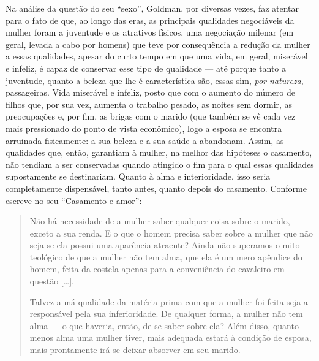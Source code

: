 Na análise da questão do seu ``sexo'', Goldman, por diversas vezes, faz
atentar para o fato de que, ao longo das eras, as principais qualidades
negociáveis da mulher foram a juventude e os atrativos físicos, uma
negociação milenar (em geral, levada a cabo por homens) que teve por
consequência a redução da mulher a essas qualidades, apesar do curto
tempo em que uma vida, em geral, miserável e infeliz, é capaz de
conservar esse tipo de qualidade --- até porque tanto a juventude, quanto
a beleza que lhe é característica são, essas sim, \emph{por natureza},
passageiras. Vida miserável e infeliz, posto que com o aumento do número
de filhos que, por sua vez, aumenta o trabalho pesado, as noites sem
dormir, as preocupações e, por fim, as brigas com o marido (que também
se vê cada vez mais pressionado do ponto de vista econômico), logo a
esposa se encontra arruinada fisicamente: a sua beleza e a sua saúde a
abandonam. Assim, as qualidades que, então, garantiam à mulher, na
melhor das hipóteses o casamento, não tendiam a ser conservadas quando
atingido o fim para o qual essas qualidades supostamente se destinariam.
Quanto à alma e interioridade, isso seria completamente dispensável,
tanto antes, quanto depois do casamento. Conforme escreve no seu
``Casamento e amor'':

\begin{quote}
Não há necessidade de a mulher saber qualquer coisa sobre o marido,
exceto a sua renda. E o que o homem precisa saber sobre a mulher que não
seja se ela possui uma aparência atraente? Ainda não superamos o mito
teológico de que a mulher não tem alma, que ela é um mero apêndice do
homem, feita da costela apenas para a conveniência do cavaleiro em
questão {[}\ldots{]}.

Talvez a má qualidade da matéria-prima com que a mulher foi feita seja a
responsável pela sua inferioridade. De qualquer forma, a mulher não tem
alma --- o que haveria, então, de se saber sobre ela? Além disso, quanto
menos alma uma mulher tiver, mais adequada estará à condição de esposa,
mais prontamente irá se deixar absorver em seu marido.
\end{quote}

